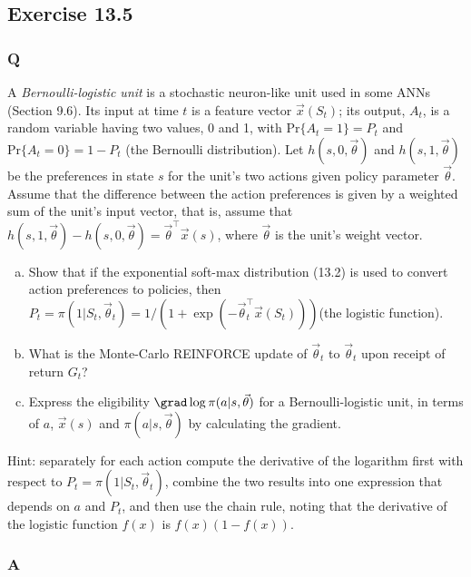 \subsection{Exercise 13.5}
\subsubsection*{Q}
A \emph{Bernoulli-logistic unit} is a stochastic neuron-like unit used in some ANNs (Section 9.6). Its input at time $t$ is a feature vector $\vec{x}(S_t)$; its output, $A_t$, is a random variable having two values, 0 and 1, with $\text{Pr}\{A_t = 1\} = P_t$ and $\text{Pr}\{A_t = 0\} = 1- P_t$ (the Bernoulli distribution). Let $h(s, 0, \vec{\theta})$ and $h(s, 1, \vec{\theta})$ be the preferences in state $s$ for the unit’s two actions given policy parameter $\vec{\theta}$. Assume that the difference between the action preferences is given by a weighted sum of the unit’s input vector, that is, assume
that $h(s, 1, \vec{\theta}) - h(s, 0, \vec{\theta}) = \vec{\theta}^\top \vec{x}(s)$, where $\vec{\theta}$ is the unit’s weight vector.

\begin{enumerate}[(a)]
    \item Show that if the exponential soft-max distribution (13.2) is used to convert action preferences to policies, then $P_t = \pi(1 \vert{}S_t, \vec{\theta}_t) = 1/(1 + \exp(-\vec{\theta}_t^\top\vec{x}(S_t)))$(the logistic function).
    \item What is the Monte-Carlo REINFORCE update of $\vec{\theta}_t$ to $\vec{\theta}_t$ upon receipt of return $G_t$?
    \item Express the eligibility $\grad\log\pi(a\vert{}s,\vec{\theta})$ for a Bernoulli-logistic unit, in terms of $a$, $\vec{x}(s)$ and $\pi(a \vert{} s, \vec{\theta})$ by calculating the gradient.
\end{enumerate}

Hint: separately for each action compute the derivative of the logarithm first with respect to $P_t = \pi(1 \vert{}S_t, \vec{\theta}_t)$, combine the two results into one expression that depends on $a$ and $P_t$, and then use the chain rule, noting that the derivative of the logistic function $f(x)$ is $f(x)(1 - f(x))$.

\subsubsection*{A}

